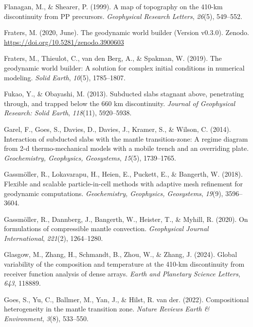 \documentclass[
  paper=a4,
  ,captions=tableheading
]{scrartcl}
\newlength{\cslhangindent}
\newenvironment{CSLReferences}[2] %
  {\begin{list}{}{%
   \setlength{\itemindent}{0pt}
   \setlength{\leftmargin}{0pt}
   \setlength{\parsep}{0pt}
   \ifodd #1
    \setlength{\leftmargin}{\cslhangindent}
    \setlength{\itemindent}{-1\cslhangindent}
   \fi
   \setlength{\itemsep}{#2\baselineskip}}}
  {\end{list}}
\begin{document}
\begin{CSLReferences}{1}{0}
Flanagan, M., \& Shearer, P. (1999). A map of topography on the 410-km
discontinuity from PP precursors. \emph{Geophysical Research Letters},
\emph{26}(5), 549--552.

Fraters, M. (2020, June). The geodynamic world builder (Version v0.3.0).
Zenodo. \url{https://doi.org/10.5281/zenodo.3900603}

{Fraters, M., Thieulot, C., van den Berg, A., \& Spakman, W.} (2019).
The geodynamic world builder: A solution for complex initial conditions
in numerical modeling. \emph{Solid Earth}, \emph{10}(5), 1785--1807.

Fukao, Y., \& Obayashi, M. (2013). Subducted slabs stagnant above,
penetrating through, and trapped below the 660 km discontinuity.
\emph{Journal of Geophysical Research: Solid Earth}, \emph{118}(11),
5920--5938.

Garel, F., Goes, S., Davies, D., Davies, J., Kramer, S., \& Wilson, C.
(2014). Interaction of subducted slabs with the mantle transition-zone:
A regime diagram from 2-d thermo-mechanical models with a mobile trench
and an overriding plate. \emph{Geochemistry, Geophysics, Geosystems},
\emph{15}(5), 1739--1765.

Gassmöller, R., Lokavarapu, H., Heien, E., Puckett, E., \& Bangerth, W.
(2018). Flexible and scalable particle-in-cell methods with adaptive
mesh refinement for geodynamic computations. \emph{Geochemistry,
Geophysics, Geosystems}, \emph{19}(9), 3596--3604.

Gassmöller, R., Dannberg, J., Bangerth, W., Heister, T., \& Myhill, R.
(2020). On formulations of compressible mantle convection.
\emph{Geophysical Journal International}, \emph{221}(2), 1264--1280.

Glasgow, M., Zhang, H., Schmandt, B., Zhou, W., \& Zhang, J. (2024).
Global variability of the composition and temperature at the 410-km
discontinuity from receiver function analysis of dense arrays.
\emph{Earth and Planetary Science Letters}, \emph{643}, 118889.

Goes, S., Yu, C., Ballmer, M., Yan, J., \& Hilst, R. van der. (2022).
Compositional heterogeneity in the mantle transition zone. \emph{Nature
Reviews Earth \& Environment}, \emph{3}(8), 533--550.


\end{CSLReferences}
\end{document}
